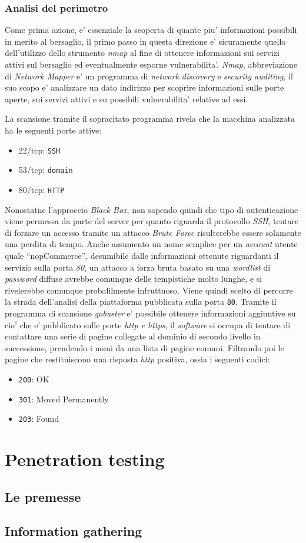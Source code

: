 \documentclass[a4paper]{report}
\newcommand{\quotes}[1]{``#1''}
\begin{document}
		\subsection{Analisi del perimetro}\label{analisi_del_perimetro}
			Come prima azione, e' essenziale la scoperta di quante piu' informazioni possibili in merito al bersaglio,
			il primo passo in questa direzione e' sicuramente quello dell'utilizzo dello strumento \emph{nmap} al fine
			di ottenere informazioni sui servizi attivi sul bersaglio ed eventualmente esporne vulnerabilita'.
			\emph{Nmap}, abbreviazione di \emph{Network Mapper} e' un programma di \emph{network discovery} e
			\emph{security auditing}, il suo scopo e' analizzare un dato indirizzo per scoprire informazioni sulle porte
			aperte, sui servizi attivi e su possibili vulnerabilita' relative ad essi.

			La scansione tramite il sopracitato programma rivela che la macchina analizzata ha le seguenti porte attive:
			\begin{itemize}
				\item 22/tcp: \texttt{SSH}
				\item 53/tcp: \texttt{domain}
				\item 80/tcp: \texttt{HTTP}
			\end{itemize}
			Nonostatne l'approccio \emph{Black Box}, non sapendo quindi che tipo di autenticazione viene permessa da
			parte del server per quanto riguarda il protocollo \emph{SSH}, tentare di forzare un accesso tramite un
			attacco \emph{Brute Force} risulterebbe essere solamente una perdita di tempo. Anche assumento un nome
			semplice per un \emph{account} utente quale \quotes{nopCommerce}, desumibile dalle informazioni ottenute
			riguardanti il servizio sulla porta \emph{80}, un attacco a forza bruta basato su una \emph{wordlist} di
			\emph{password} diffuse avrebbe comunque delle tempistiche molto lunghe, e si rivelerebbe comunque
			probalilmente infruttuoso.
			Viene quindi scelto di percorre la strada dell'analisi della piattaforma pubblicata sulla porta \texttt{80}.
			Tramite il programma di scansione \emph{gobuster} e' possibile ottenere informazioni aggiuntive su cio' che
			e' pubblicato sulle porte \emph{http e https}, il \emph{software} si occupa di tentare di contattare una
			serie di pagine collegate al dominio di secondo livello in successione, prendendo i nomi da una lista di
			pagine comuni. Filtrando poi le pagine che restituiscono una risposta \emph{http} positiva, ossia i seguenti
			codici:
			\begin{itemize}
				\item \texttt{200}: OK
				\item \texttt{301}: Moved Permanently
				\item \texttt{203}: Found
			\end{itemize}
			

\chapter{Penetration testing}\label{penetration_testing}
	\section{Le premesse}\label{le_premesse}
	\section{Information gathering}\label{information_gathering}
\end{document}
